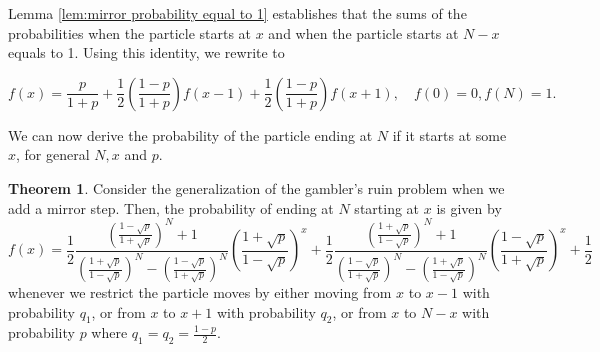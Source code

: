 \documentclass[reqno]{amsart}
\theoremstyle{definition}
\newtheorem{theorem}{Theorem}[section]
\theoremstyle{definition}
\theoremstyle{remark}
\begin{document}
Lemma \ref{lem:mirror probability equal to 1} establishes that the sums of the probabilities when the particle starts at $x$ and when the particle starts at $N-x$ equals to 1. Using this identity, we rewrite  to

\begin{equation}\label{eq:inhomogeneous eq}
    f(x)=\frac{p}{1+p}+\frac{1}{2}\left(\frac{1-p}{1+p}\right)f(x-1)+\frac{1}{2}\left(\frac{1-p}{1+p}\right)f(x+1),  \quad f(0)=0, f(N)=1.
\end{equation}

We can now derive the probability of the particle ending at $N$ if it starts at some $x$, for general $N, x$ and $p$.

\begin{theorem}\label{thm:probability mirror}
Consider the generalization of the gambler's ruin problem when we add a mirror step. Then, the probability of ending at $N$ starting at $x$ is given by
\begin{equation*}
    f(x)=\frac{1}{2}\frac{\left(\frac{1-\sqrt{p}}{1+\sqrt{p}}\right)^N+1}{\left(\frac{1+\sqrt{p}}{1-\sqrt{p}}\right)^N-\left(\frac{1-\sqrt{p}}{1+\sqrt{p}}\right)^N}\left(\frac{1+\sqrt{p}}{1-\sqrt{p}}\right)^x
    +\frac{1}{2}\frac{\left(\frac{1+\sqrt{p}}{1-\sqrt{p}}\right)^N+1}{\left(\frac{1-\sqrt{p}}{1+\sqrt{p}}\right)^N-\left(\frac{1+\sqrt{p}}{1-\sqrt{p}}\right)^N}\left(\frac{1-\sqrt{p}}{1+\sqrt{p}}\right)^x+\frac{1}{2}
\end{equation*}
whenever we restrict the particle moves by either moving from $x$ to $x-1$ with probability $q_1$, or from $x$ to $x+1$ with probability $q_2$, or from $x$ to $N-x$ with probability $p$ where $q_1=q_2=\frac{1-p}{2}$.
\end{theorem}
\end{document}
